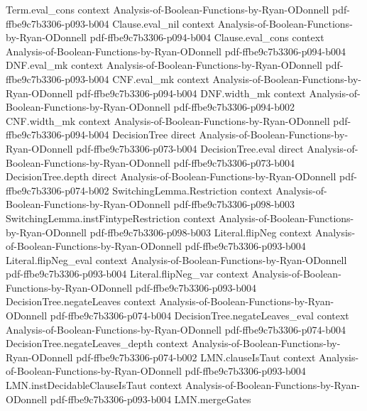 \begin{lemma}
  {Term.eval_cons}
  {context}
  {Analysis-of-Boolean-Functions-by-Ryan-ODonnell}
  {pdf-ffbe9c7b3306-p093-b004}
\proofstep
  {Clause.eval_nil}
  {context}
  {Analysis-of-Boolean-Functions-by-Ryan-ODonnell}
  {pdf-ffbe9c7b3306-p094-b004}
\proofstep
  {Clause.eval_cons}
  {context}
  {Analysis-of-Boolean-Functions-by-Ryan-ODonnell}
  {pdf-ffbe9c7b3306-p094-b004}
\proofstep
  {DNF.eval_mk}
  {context}
  {Analysis-of-Boolean-Functions-by-Ryan-ODonnell}
  {pdf-ffbe9c7b3306-p093-b004}
\proofstep
  {CNF.eval_mk}
  {context}
  {Analysis-of-Boolean-Functions-by-Ryan-ODonnell}
  {pdf-ffbe9c7b3306-p094-b004}
\proofstep
  {DNF.width_mk}
  {context}
  {Analysis-of-Boolean-Functions-by-Ryan-ODonnell}
  {pdf-ffbe9c7b3306-p094-b002}
\proofstep
  {CNF.width_mk}
  {context}
  {Analysis-of-Boolean-Functions-by-Ryan-ODonnell}
  {pdf-ffbe9c7b3306-p094-b004}
\proofstep
  {DecisionTree}
  {direct}
  {Analysis-of-Boolean-Functions-by-Ryan-ODonnell}
  {pdf-ffbe9c7b3306-p073-b004}
\proofstep
  {DecisionTree.eval}
  {direct}
  {Analysis-of-Boolean-Functions-by-Ryan-ODonnell}
  {pdf-ffbe9c7b3306-p073-b004}
\proofstep
  {DecisionTree.depth}
  {direct}
  {Analysis-of-Boolean-Functions-by-Ryan-ODonnell}
  {pdf-ffbe9c7b3306-p074-b002}
\proofstep
  {SwitchingLemma.Restriction}
  {context}
  {Analysis-of-Boolean-Functions-by-Ryan-ODonnell}
  {pdf-ffbe9c7b3306-p098-b003}
\proofstep
  {SwitchingLemma.instFintypeRestriction}
  {context}
  {Analysis-of-Boolean-Functions-by-Ryan-ODonnell}
  {pdf-ffbe9c7b3306-p098-b003}
\proofstep
  {Literal.flipNeg}
  {context}
  {Analysis-of-Boolean-Functions-by-Ryan-ODonnell}
  {pdf-ffbe9c7b3306-p093-b004}
\proofstep
  {Literal.flipNeg_eval}
  {context}
  {Analysis-of-Boolean-Functions-by-Ryan-ODonnell}
  {pdf-ffbe9c7b3306-p093-b004}
\proofstep
  {Literal.flipNeg_var}
  {context}
  {Analysis-of-Boolean-Functions-by-Ryan-ODonnell}
  {pdf-ffbe9c7b3306-p093-b004}
\proofstep
  {DecisionTree.negateLeaves}
  {context}
  {Analysis-of-Boolean-Functions-by-Ryan-ODonnell}
  {pdf-ffbe9c7b3306-p074-b004}
\proofstep
  {DecisionTree.negateLeaves_eval}
  {context}
  {Analysis-of-Boolean-Functions-by-Ryan-ODonnell}
  {pdf-ffbe9c7b3306-p074-b004}
\proofstep
  {DecisionTree.negateLeaves_depth}
  {context}
  {Analysis-of-Boolean-Functions-by-Ryan-ODonnell}
  {pdf-ffbe9c7b3306-p074-b002}
\proofstep
  {LMN.clauseIsTaut}
  {context}
  {Analysis-of-Boolean-Functions-by-Ryan-ODonnell}
  {pdf-ffbe9c7b3306-p093-b004}
\proofstep
  {LMN.instDecidableClauseIsTaut}
  {context}
  {Analysis-of-Boolean-Functions-by-Ryan-ODonnell}
  {pdf-ffbe9c7b3306-p093-b004}
\proofstep
  {LMN.mergeGates}

\end{lemma}
